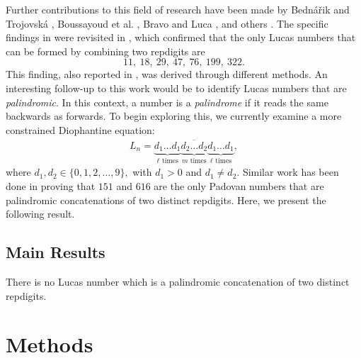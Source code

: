 Further contributions to this field of research have been made by Bedná\v rik and Trojovská \cite{bed}, Boussayoud et al. \cite{bou}, Bravo and Luca \cite{bravo}, and others \cite{ddam, erd, raya, tro, troj, qu}. The specific findings in \cite{qu} were revisited in \cite{er}, which confirmed that the only Lucas numbers that can be formed by combining two repdigits are
$$ 11,~18, ~29, ~47,~76, ~199, ~322.$$
This finding, also reported in \cite{qu}, was derived through different methods. An interesting follow-up to this work \cite{er} would be to identify Lucas numbers that are \textit{palindromic}. In this context, a number is a \textit{palindrome} if it reads the same backwards as forwards. To begin exploring this, we currently examine a more constrained Diophantine equation:
\begin{align}\label{eq1.1l}
	L_n = \overline{\underbrace{d_1 \ldots d_1}_{\ell \text{ times}}\underbrace{d_2 \ldots d_2}_{m \text{ times}}\underbrace{d_1 \ldots d_1}_{\ell \text{ times}}},
\end{align} 
where \( d_1, d_2 \in \{0, 1, 2, \ldots, 9\}, \) with \( d_1 > 0 \) and \(d_1\ne d_2\). Similar work has been done in \cite{chal} proving that $151$ and $616$ are the only Padovan numbers that are palindromic concatenations of two distinct repdigits. 
\newpage
Here, we present the following result.
\subsection{Main Results}\label{sec:1.2l}
\begin{theorem}\label{thm1.1l} 
	There is no Lucas number which is a palindromic concatenation of two distinct repdigits.
\end{theorem}

\section{Methods}
